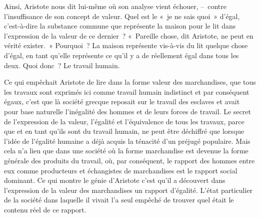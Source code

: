 \documentclass[french,twoside]{book} %
\begin{document}
Ainsi, Aristote nous dit lui-même où son analyse vient échouer, – contre l’insuffisance de son concept de valeur. Quel est le « je ne sais quoi » d’égal, c’est-à-dire la substance commune que représente la maison pour le lit dans l’expression de la valeur de ce dernier ? « Pareille chose, dit Aristote, ne peut en vérité exister. » Pourquoi ? La maison représente vis-à-vis du lit quelque chose d’égal, en tant qu’elle représente ce qu’il y a de réellement égal dans tous les deux. Quoi donc ? Le travail humain.\par
Ce qui empêchait Aristote de lire dans la forme valeur des marchandises, que tous les travaux sont exprimés ici comme travail humain indistinct et par conséquent égaux, c’est que là société grecque reposait sur le travail des esclaves et avait pour base naturelle l’inégalité des hommes et de leurs forces de travail. Le secret de l’expression de la valeur, l’égalité et l’équivalence de tous les travaux, parce que et en tant qu’ils sont du travail humain, ne peut être déchiffré que lorsque l’idée de l’égalité humaine a déjà acquis la ténacité d’un préjugé populaire. Mais cela n’a lieu que dans une société où la forme marchandise est devenue la forme générale des produits du travail, où, par conséquent, le rapport des hommes entre eux comme producteurs et échangistes de marchandises est le rapport social dominant. Ce qui montre le génie d’Aristote c’est qu’il a découvert dans l’expression de la valeur des marchandises un rapport d’égalité. L’état particulier de la société dans laquelle il vivait l’a seul empêché de trouver quel était le contenu réel de ce rapport.
\end{document}
